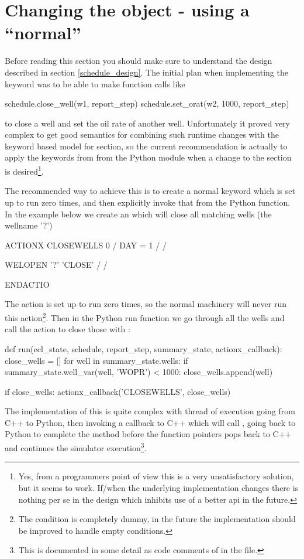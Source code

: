 \section{Changing the  object - using a ``normal'' \actionx{}}
\label{pyaction_actionx}
Before reading this section you should make sure to understand the
 design described in section \ref{schedule_design}. The
initial plan when implementing the \pyaction{} keyword was to be able to make
function calls like
\begin{code}
  schedule.close_well(w1, report_step)
  schedule.set_orat(w2, 1000, report_step)
\end{code}
to close a well and set the oil rate of another well. Unfortunately it proved
very complex to get good semantics for combining such runtime changes with the
keyword based model for  section, so the current recommendation is
actually to apply the keywords from  from the Python module when a
change to the  section is desired\footnote{Yes, from a programmers
point of view this is a very unsatisfactory solution, but it seems to work.
If/when the underlying  implementation changes there is
nothing per se in the \pyaction{} design which inhibits use of a better
 api in the future.}.

The recommended way to achieve this is to create a normal \actionx{} keyword
which is set up to run zero times, and then explicitly invoke that from the
Python  function. In the example below we create an \actionx{}
 which will close all matching wells (the wellname '?')
\begin{deck}
ACTIONX
  CLOSEWELLS 0 /
  DAY = 1 /
/

WELOPEN
  '?' 'CLOSE' /
/

ENDACTIO
\end{deck}
The  action is set up to run zero times, so the normal
\actionx{} machinery will never run this action\footnote{The condition
 is completely dummy, in the future the \actionx{}
implementation should be improved to handle empty conditions.}. Then in the
Python run function we go through all the wells and call the
 action to close those with :
\begin{code}
def run(ecl_state, schedule, report_step, summary_state, actionx_callback):
    close_wells = []
    for well in summary_state.wells:
        if summary_state.well_var(well, 'WOPR') < 1000:
           close_wells.append(well)

    if close_wells:
        actionx_callback('CLOSEWELLS', close_wells)
\end{code}
The implementation of this is quite complex with thread of execution going from
C++ to Python, then invoking a callback to C++ which will call
, going back to Python to
complete the  method before the function pointers pops back to
C++ and continues the simulator execution\footnote{This is documented in some
detail as code comments of  in the
 file.}.


